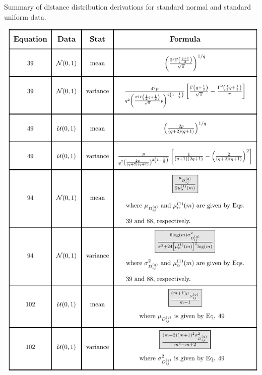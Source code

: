 \documentclass[10pt,letterpaper]{article}\usepackage[]{graphicx}\usepackage[]{color}
\begin{document}
\begin{table}[H]
\caption{Summary of distance distribution derivations for standard normal and standard uniform data.}
\label{tab:dist_distr_general1}
\centering
\includegraphics[clip,trim=0.27cm 0.0cm 0.0cm 0.03cm,width=\textwidth]{updated_distributions_table(5-23-2019).pdf}
\end{table}
\end{document}
